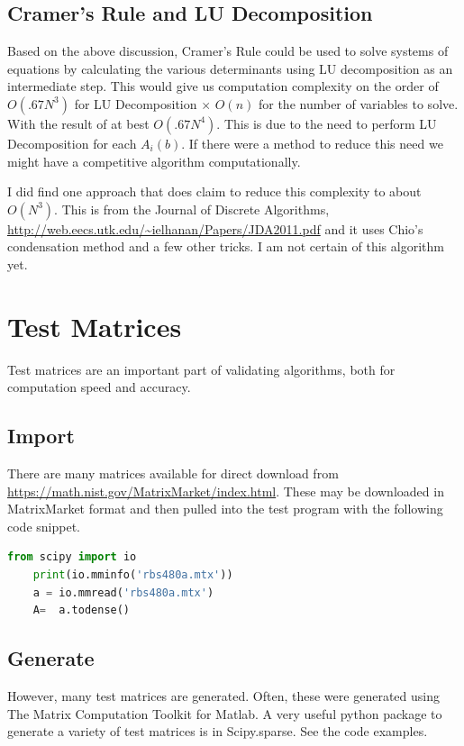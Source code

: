 \documentclass[12pt]{article}
\begin{document}
\subsection{Cramer's Rule and LU Decomposition}
Based on the above discussion, Cramer's Rule could be used to solve systems of equations by calculating the various determinants using LU decomposition as an intermediate step. This would give us computation complexity on the order of $O(.67N^3)$ for LU Decomposition $\times$ $O(n)$ for the number of variables to solve. With the result of at best $O(.67N^4)$. This is due to the need to perform LU Decomposition for each $A_i(b)$. If there were a method to reduce this need we might have a competitive algorithm computationally.

I did find one approach that does claim to reduce this complexity to about $O(N^3)$. This is from the Journal of Discrete Algorithms, \url{http://web.eecs.utk.edu/~ielhanan/Papers/JDA2011.pdf} and it uses Chio's condensation method and a few other tricks. I am not certain of this algorithm yet.


\section{Test Matrices}
Test matrices are an important part of validating algorithms, both for computation speed and accuracy. 

\subsection{Import}
There are many matrices available for direct download from \url{https://math.nist.gov/MatrixMarket/index.html}. These may be downloaded in MatrixMarket format and then pulled into the test program with the following code snippet.

\begin{lstlisting}[language=Python]
	from scipy import io
	print(io.mminfo('rbs480a.mtx'))
	a = io.mmread('rbs480a.mtx')
	A=  a.todense()
\end{lstlisting}

\subsection{Generate}
However, many test matrices are generated. Often, these were generated using The Matrix Computation Toolkit for Matlab. A very useful python package to generate a variety of test matrices is in Scipy.sparse. See the code examples.
\end{document}
